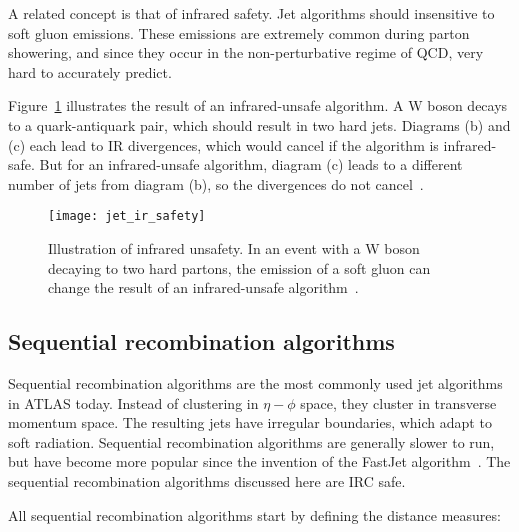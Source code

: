 A related concept is that of infrared safety.
Jet algorithms should insensitive to soft gluon emissions.
These emissions are extremely common during parton showering, and since they occur in the non-perturbative regime of QCD,
very hard to accurately predict.

Figure~\ref{fig:jet_ir_safety} illustrates the result of an infrared-unsafe algorithm.
A W boson decays to a quark-antiquark pair, which should result in two hard jets.
Diagrams (b) and (c) each lead to IR divergences, which would cancel if the algorithm is infrared-safe.
But for an infrared-unsafe algorithm, diagram (c) leads to a different number of jets from diagram (b), so the divergences do not cancel~\cite{jet-jetography}.

\begin{figure}[!ht]
    \centering
\texttt{[image: jet\_ir\_safety]}
\caption{Illustration of infrared unsafety.
In an event with a W boson decaying to two hard partons, the emission of a soft gluon can change the result of an infrared-unsafe algorithm~\cite{jet-jetography}.}
\label{fig:jet_ir_safety}
\end{figure}

\subsection{Sequential recombination algorithms}\label{subsec:jet_seq_recombination}

Sequential recombination algorithms are the most commonly used jet algorithms in ATLAS today.
Instead of clustering in $\eta-\phi$ space, they cluster in transverse momentum space.
The resulting jets have irregular boundaries, which adapt to soft radiation.
Sequential recombination algorithms are generally slower to run,
but have become more popular since the invention of the FastJet algorithm~\cite{jet-fastjet}.
The sequential recombination algorithms discussed here are IRC safe.

All sequential recombination algorithms start by defining the distance measures:

